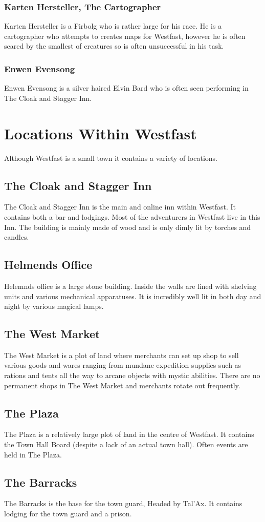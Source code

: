 \subsubsection{Karten Hersteller, The Cartographer}
Karten Hersteller is a Firbolg who is rather large for his race. He is a cartographer who attempts to creates maps for Westfast, however he is often scared by the smallest of creatures so is often unsuccessful in his task.
\subsubsection{Enwen Evensong}
Enwen Evensong is a silver haired Elvin Bard who is often seen performing in The Cloak and Stagger Inn.
\section{Locations Within Westfast}
Although Westfast is a small town it contains a variety of locations.
\subsection{The Cloak and Stagger Inn}
The Cloak and Stagger Inn is the main and online inn within Westfast. It contains both a bar and lodgings. Most of the adventurers in Westfast live in this Inn. The building is mainly made of wood and is only dimly lit by torches and candles.
\subsection{Helmends Office}
Helemnds office is a large stone building. Inside the walls are lined with shelving units and various mechanical apparatuses. It is incredibly well lit in both day and night by various magical lamps.
\subsection{The West Market}
The West Market is a plot of land where merchants can set up shop to sell various goods and wares ranging from mundane expedition supplies such as rations and tents all the way to arcane objects with mystic abilities. There are no permanent shops in The West Market and merchants rotate out frequently.
\subsection{The Plaza}
The Plaza is a relatively large plot of land in the centre of Westfast. It contains the Town Hall Board (despite a lack of an actual town hall). Often events are held in The Plaza.
\subsection{The Barracks}
The Barracks is the base for the town guard, Headed by Tal'Ax. It contains lodging for the town guard and a prison.

